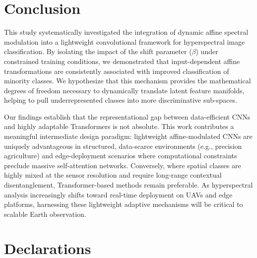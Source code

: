 \documentclass[pdflatex,sn-mathphys-num]{sn-jnl}
\theoremstyle{thmstyleone}
\theoremstyle{thmstyletwo}
\theoremstyle{thmstylethree}
\begin{document}
\section{Conclusion}

This study systematically investigated the integration of dynamic affine spectral modulation into a lightweight convolutional framework for hyperspectral image classification. By isolating the impact of the shift parameter ($\beta$) under constrained training conditions, we demonstrated that input-dependent affine transformations are consistently associated with improved classification of minority classes. We hypothesize that this mechanism provides the mathematical degrees of freedom necessary to dynamically translate latent feature manifolds, helping to pull underrepresented classes into more discriminative sub-spaces.

Our findings establish that the representational gap between data-efficient CNNs and highly adaptable Transformers is not absolute. This work contributes a meaningful intermediate design paradigm: lightweight affine-modulated CNNs are uniquely advantageous in structured, data-scarce environments (e.g., precision agriculture) and edge-deployment scenarios where computational constraints preclude massive self-attention networks. Conversely, where spatial classes are highly mixed at the sensor resolution and require long-range contextual disentanglement, Transformer-based methods remain preferable. As hyperspectral analysis increasingly shifts toward real-time deployment on UAVs and edge platforms, harnessing these lightweight adaptive mechanisms will be critical to scalable Earth observation.

\section*{Declarations}
\end{document}
